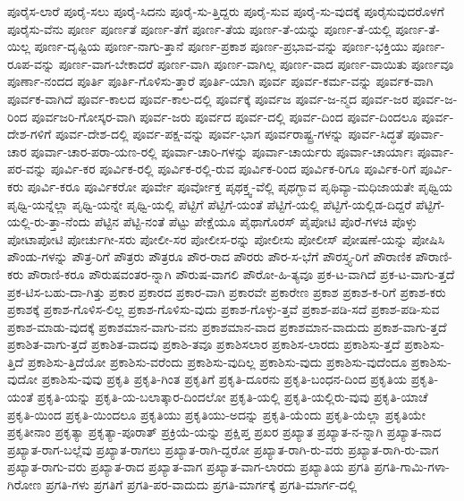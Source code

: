 {ಪೂರೈಸ-ಲಾರೆ
ಪೂರೈ-ಸಲು
ಪೂರೈ-ಸಿದನು
ಪೂರೈ-ಸು-ತ್ತಿದ್ದರು
ಪೂರೈ-ಸುವ
ಪೂರೈ-ಸು-ವುದಕ್ಕೆ
ಪೂರೈಸುವುದರೊಳಗೆ
ಪೂರೈಸು-ವೆನು
ಪೂರ್ಣ
ಪೂರ್ಣತೆ
ಪೂರ್ಣ-ತೆಗೆ
ಪೂರ್ಣ-ತೆಯ
ಪೂರ್ಣ-ತೆ-ಯನ್ನು
ಪೂರ್ಣ-ತೆ-ಯಲ್ಲಿ
ಪೂರ್ಣ-ತೆ-ಯಿಲ್ಲ
ಪೂರ್ಣ-ದೃಷ್ಟಿಯ
ಪೂರ್ಣ-ನಾಗು-ತ್ತಾನೆ
ಪೂರ್ಣ-ಪ್ರಕಾಶ
ಪೂರ್ಣ-ಪ್ರಭಾವ-ವನ್ನು
ಪೂರ್ಣ-ಭಕ್ತಿಯು
ಪೂರ್ಣ-ರೂಪ-ವನ್ನು
ಪೂರ್ಣ-ವಾಗ-ಬೇಕಾದರೆ
ಪೂರ್ಣ-ವಾಗಿ
ಪೂರ್ಣ-ವಾಗಿಲ್ಲ
ಪೂರ್ಣ-ವಾದ
ಪೂರ್ಣ-ವಾಯಿತು
ಪೂರ್ಣವೂ
ಪೂರ್ಣಾ-ನಂದದ
ಪೂರ್ತಿ
ಪೂರ್ತಿ-ಗೊಳಿಸು-ತ್ತಾರೆ
ಪೂರ್ತಿ-ಯಾಗಿ
ಪೂರ್ವ
ಪೂರ್ವ-ಕರ್ಮ-ವನ್ನು
ಪೂರ್ವಕ-ವಾಗಿ
ಪೂರ್ವಕ-ವಾಗಿದೆ
ಪೂರ್ವ-ಕಾಲದ
ಪೂರ್ವ-ಕಾಲ-ದಲ್ಲಿ
ಪೂರ್ವಕ್ಕೆ
ಪೂರ್ವಜ
ಪೂರ್ವ-ಜ-ನ್ಮದ
ಪೂರ್ವ-ಜರ
ಪೂರ್ವ-ಜ-ರಿಂದ
ಪೂರ್ವಜರಿ-ಗೋಸ್ಕರ-ವಾಗಿ
ಪೂರ್ವ-ಜರು
ಪೂರ್ವದ
ಪೂರ್ವ-ದಲ್ಲಿ
ಪೂರ್ವ-ದಿಂದ
ಪೂರ್ವ-ದಿಂದಲೂ
ಪೂರ್ವ-ದೇಶ-ಗಳಿಗೆ
ಪೂರ್ವ-ದೇಶ-ದಲ್ಲಿ
ಪೂರ್ವ-ಪಕ್ಷ-ವನ್ನು
ಪೂರ್ವ-ಭಾಗ
ಪೂರ್ವರಾಷ್ಟ್ರ-ಗಳನ್ನು
ಪೂರ್ವ-ಸಿದ್ಧತೆ
ಪೂರ್ವಾ-ಚಾರ
ಪೂರ್ವಾ-ಚಾರ-ಪರಾ-ಯಣ-ರಲ್ಲಿ
ಪೂರ್ವಾ-ಚಾರಿ-ಗಳನ್ನು
ಪೂರ್ವಾ-ಚಾರ್ಯರು
ಪೂರ್ವಾ-ಚಾರ್ಯಾಃ
ಪೂರ್ವಾ-ಪರ-ವನ್ನು
ಪೂರ್ವಿ-ಕರ
ಪೂರ್ವಿಕ-ರಲ್ಲಿ
ಪೂರ್ವಿಕ-ರಲ್ಲಿ-ರುವ
ಪೂರ್ವಿಕ-ರಿಂದ
ಪೂರ್ವಿಕ-ರಿಗೂ
ಪೂರ್ವಿಕ-ರಿಗೆ
ಪೂರ್ವಿ-ಕರು
ಪೂರ್ವಿ-ಕರೂ
ಪೂರ್ವಿಕರೋ
ಪೂರ್ವೇ
ಪೂರ್ವೋಕ್ತ
ಪೃಥಕ್ತ್ವ-ವೆಲ್ಲಿ
ಪೃಥಗ್ಭಾವ
ಪೃಥಿವ್ಯಾ-ಮಧಿಜಾಯತೇ
ಪೃಥ್ವಿಯ
ಪೃಥ್ವಿ-ಯನ್ನೆಲ್ಲಾ
ಪೃಥ್ವಿ-ಯನ್ನೇ
ಪೃಥ್ವಿ-ಯಲ್ಲಿ
ಪೆಟ್ಟಿಗೆ
ಪೆಟ್ಟಿಗೆ-ಯಂತೆ
ಪೆಟ್ಟಿಗೆ-ಯಲ್ಲಿ
ಪೆಟ್ಟಿಗೆ-ಯಲ್ಲಿಡ-ದಿದ್ದರೆ
ಪೆಟ್ಟಿಗೆ-ಯಲ್ಲಿ-ರು-ತ್ತಾ-ನೆಂದು
ಪೆಟ್ಟಿನ
ಪೆಟ್ಟಿ-ನಂತೆ
ಪೆಟ್ಟು
ಪೇಕ್ಷೆಯೂ
ಪೈಥಾಗೊರಸ್
ಪೈಪೋಟಿ
ಪೊರೆ-ಗಳಚಿ
ಪೊಳ್ಳು
ಪೋಟಾಪೋಟಿ
ಪೋರ್ಚುಗೀ-ಸರು
ಪೋಲೀ-ಸರ
ಪೋಲೀಸ-ರನ್ನು
ಪೋಲೀಸು
ಪೋಲೀಸ್
ಪೋಷಣೆ-ಯನ್ನು
ಪೋಷಿಸಿ
ಪೌಂಡು-ಗಳನ್ನು
ಪೌತ್ರ-ರಿಗೆ
ಪೌತ್ರರು
ಪೌತ್ರರೂ
ಪೌರ-ರಾದ
ಪೌರರು
ಪೌರ-ಸ-ಭೆಗೆ
ಪೌರಸ್ತ್ಯ-ರಿಗೆ
ಪೌರಾಣಿಕ
ಪೌರಾಣಿ-ಕರು
ಪೌರಾಣಿ-ಕರೂ
ಪೌರುಷವಂತರ-ನ್ನಾಗಿ
ಪೌರುಷ-ವಾಗಲಿ
ಪೌರೋ-ಹಿ-ತ್ಯವೂ
ಪ್ರಕ-ಟ-ವಾಗಿದೆ
ಪ್ರಕ-ಟ-ವಾಗು-ತ್ತದೆ
ಪ್ರಕ-ಟಿಸ-ಬಹು-ದಾ-ಗಿತ್ತು
ಪ್ರಕಾರ
ಪ್ರಕಾರದ
ಪ್ರಕಾರ-ವಾಗಿ
ಪ್ರಕಾರವೇ
ಪ್ರಕಾರೇಣ
ಪ್ರಕಾಶ
ಪ್ರಕಾಶ-ಕ-ರಿಗೆ
ಪ್ರಕಾಶ-ಕರು
ಪ್ರಕಾಶಕ್ಕೆ
ಪ್ರಕಾಶ-ಗೊಳಿಸ-ಲಿಲ್ಲ
ಪ್ರಕಾಶ-ಗೊಳಿಸು-ವುದು
ಪ್ರಕಾಶ-ಗೊಳ್ಳು-ತ್ತವೆ
ಪ್ರಕಾಶ-ಪಡಿ-ಸದೆ
ಪ್ರಕಾಶ-ಪಡಿ-ಸುವ
ಪ್ರಕಾಶ-ಮಾಡು-ವುದಕ್ಕೆ
ಪ್ರಕಾಶಮಾನ-ವಾಗು-ವನು
ಪ್ರಕಾಶಮಾನ-ವಾದ
ಪ್ರಕಾಶಮಾನ-ವಾದುದು
ಪ್ರಕಾಶ-ವಾಗು-ತ್ತದೆ
ಪ್ರಕಾಶಿತ-ವಾಗು-ತ್ತದೆ
ಪ್ರಕಾಶಿತ-ವಾದವು
ಪ್ರಕಾಶಿ-ತವೂ
ಪ್ರಕಾಶಿಸಲಾರ
ಪ್ರಕಾಶಿಸ-ಲಾರದು
ಪ್ರಕಾಶಿಸು-ತ್ತದೆ
ಪ್ರಕಾಶಿಸು-ತ್ತಿದೆ
ಪ್ರಕಾಶಿಸು-ತ್ತಿದೆಯೋ
ಪ್ರಕಾಶಿಸು-ವರೆಂದು
ಪ್ರಕಾಶಿಸು-ವುದಿಲ್ಲ
ಪ್ರಕಾಶಿಸು-ವುದು
ಪ್ರಕಾಶಿಸು-ವುದೆಂದೂ
ಪ್ರಕಾಶಿಸು-ವುದೋ
ಪ್ರಕಾಶಿಸು-ವುವು
ಪ್ರಕೃತಿ
ಪ್ರಕೃತಿ-ಗಿಂತ
ಪ್ರಕೃತಿಗೆ
ಪ್ರಕೃತಿ-ದೂರನು
ಪ್ರಕೃತಿ-ಬಂಧನ-ದಿಂದ
ಪ್ರಕೃತಿಯ
ಪ್ರಕೃತಿ-ಯಂತೆ
ಪ್ರಕೃತಿ-ಯನ್ನು
ಪ್ರಕೃತಿ-ಯ-ಬಲಾತ್ಕಾರ-ದಿಂದಲೋ
ಪ್ರಕೃತಿ-ಯಲ್ಲಿ
ಪ್ರಕೃತಿ-ಯಲ್ಲಿರು-ವುವು
ಪ್ರಕೃತಿ-ಯಾಚೆ
ಪ್ರಕೃತಿ-ಯಿಂದ
ಪ್ರಕೃತಿ-ಯಿಂದಲೂ
ಪ್ರಕೃತಿಯು
ಪ್ರಕೃತಿಯು-ಅದನ್ನು
ಪ್ರಕೃತಿ-ಯೆಂದು
ಪ್ರಕೃತಿ-ಯೆಲ್ಲಾ
ಪ್ರಕೃತಿಯೇ
ಪ್ರಕೃತೀನಾಂ
ಪ್ರಕೃತ್ಯಾ
ಪ್ರಕೃತ್ಯಾ-ಪೂರಾತ್
ಪ್ರಕ್ರಿಯೆ-ಯನ್ನು
ಪ್ರಕ್ಷಿಪ್ತ
ಪ್ರಖರ
ಪ್ರಖ್ಯಾತ
ಪ್ರಖ್ಯಾತ-ನ-ನ್ನಾಗಿ
ಪ್ರಖ್ಯಾತ-ನಾದ
ಪ್ರಖ್ಯಾತ-ರಾಗ-ಬಲ್ಲೆವು
ಪ್ರಖ್ಯಾತ-ರಾಗಲು
ಪ್ರಖ್ಯಾತ-ರಾಗಿ-ದ್ದರೋ
ಪ್ರಖ್ಯಾತ-ರಾಗಿ-ರು-ವರು
ಪ್ರಖ್ಯಾತ-ರಾಗಿ-ರು-ವಾಗ
ಪ್ರಖ್ಯಾತ-ರಾಗು-ವರು
ಪ್ರಖ್ಯಾತ-ರಾದ
ಪ್ರಖ್ಯಾತ-ವಾಗ
ಪ್ರಖ್ಯಾತ-ವಾಗ-ಲಾರದು
ಪ್ರಖ್ಯಾತಿಯ
ಪ್ರಗತಿ
ಪ್ರಗತಿ-ಗಾಮಿ-ಗಳಾ-ಗಿರೋಣ
ಪ್ರಗತಿ-ಗಳು
ಪ್ರಗತಿಗೆ
ಪ್ರಗತಿ-ಪರ-ವಾದುದು
ಪ್ರಗತಿ-ಮಾರ್ಗಕ್ಕೆ
ಪ್ರಗತಿ-ಮಾರ್ಗ-ದಲ್ಲಿ
}
